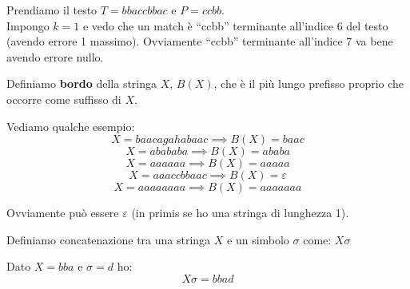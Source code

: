 \begin{esempio}
  Prendiamo il testo $T=bbaccbbac$ e $P=ccbb$.\\
  Impongo $k=1$ e vedo che un match è ``ccbb'' terminante all'indice 6 del testo
  (avendo errore 1 massimo). Ovviamente ``ccbb'' terminante all'indice 7 va bene
  avendo errore nullo.\\
  
\end{esempio}
\begin{definizione}
  Definiamo \textbf{bordo} della stringa $X$, $B(X)$, che è il più lungo
  prefisso proprio che occorre come suffisso di $X$.
  \begin{esempio}
    Vediamo qualche esempio:
    \[X=baacagahabaac\implies B(X)=baac\]
    \[X=abababa\implies B(X)=ababa\]
    \[X=aaaaaa\implies B(X)=aaaaa\]
    \[X=aaaccbbaac\implies B(X)=\varepsilon\]
    \[X=aaaaaaaa\implies B(X)=aaaaaaa\]
  \end{esempio}
  Ovviamente può essere $\varepsilon$ (in primis se ho una stringa di lunghezza
  1).
\end{definizione}
\begin{definizione}
  Definiamo concatenazione tra una stringa $X$ e un simbolo $\sigma$ come:
  $X\sigma$
\end{definizione}
\begin{esempio}
  Dato $X=bba$ e $\sigma=d$ ho:
  \[X\sigma = bbad\]
\end{esempio}
